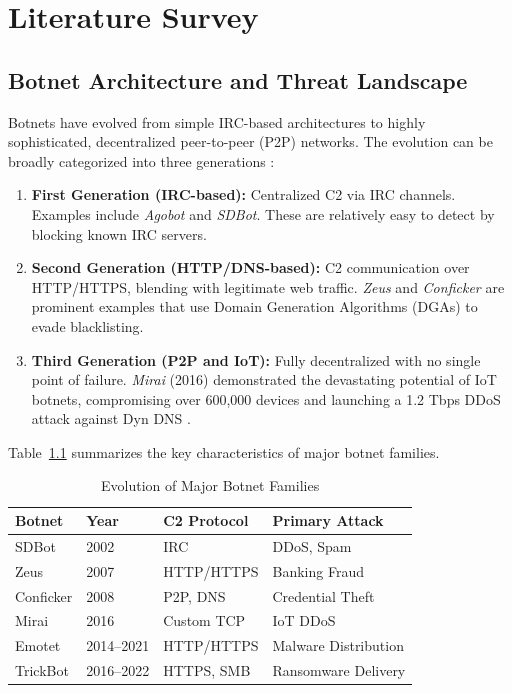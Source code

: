 \chapter{Literature Survey}

\section{Botnet Architecture and Threat Landscape}

Botnets have evolved from simple IRC-based architectures to highly sophisticated, decentralized peer-to-peer (P2P) networks. The evolution can be broadly categorized into three generations \cite{silva2013botnets}:

\begin{enumerate}
    \item \textbf{First Generation (IRC-based):} Centralized C2 via IRC channels. Examples include \textit{Agobot} and \textit{SDBot}. These are relatively easy to detect by blocking known IRC servers.
    \item \textbf{Second Generation (HTTP/DNS-based):} C2 communication over HTTP/HTTPS, blending with legitimate web traffic. \textit{Zeus} and \textit{Conficker} are prominent examples that use Domain Generation Algorithms (DGAs) to evade blacklisting.
    \item \textbf{Third Generation (P2P and IoT):} Fully decentralized with no single point of failure. \textit{Mirai} (2016) demonstrated the devastating potential of IoT botnets, compromising over 600,000 devices and launching a 1.2 Tbps DDoS attack against Dyn DNS \cite{antonakakis2017understanding}.
\end{enumerate}

Table~\ref{tab:botnet_evolution} summarizes the key characteristics of major botnet families.

\begin{table}[H]
\centering
\caption{Evolution of Major Botnet Families}
\label{tab:botnet_evolution}
\begin{tabular}{l l l l}
\toprule
\textbf{Botnet} & \textbf{Year} & \textbf{C2 Protocol} & \textbf{Primary Attack} \\
\midrule
SDBot & 2002 & IRC & DDoS, Spam \\
Zeus & 2007 & HTTP/HTTPS & Banking Fraud \\
Conficker & 2008 & P2P, DNS & Credential Theft \\
Mirai & 2016 & Custom TCP & IoT DDoS \\
Emotet & 2014--2021 & HTTP/HTTPS & Malware Distribution \\
TrickBot & 2016--2022 & HTTPS, SMB & Ransomware Delivery \\
\bottomrule
\end{tabular}
\end{table}

